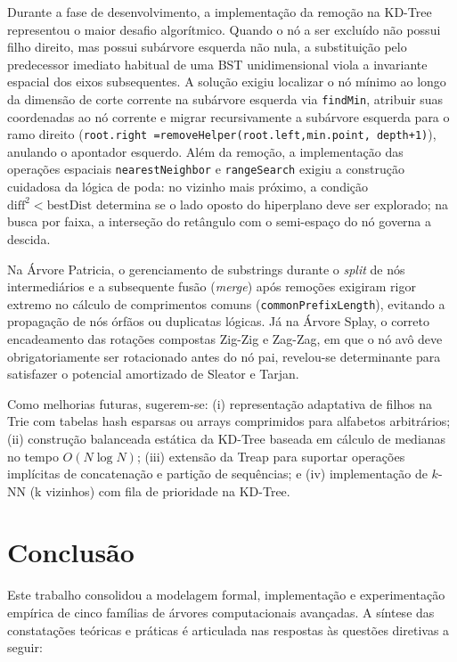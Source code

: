 \documentclass[11pt, a4paper]{article}
\begin{document}
Durante a fase de desenvolvimento, a implementação da remoção na KD-Tree representou o maior desafio algorítmico. Quando o nó a ser excluído não possui filho direito, mas possui subárvore esquerda não nula, a substituição pelo predecessor imediato habitual de uma BST unidimensional viola a invariante espacial dos eixos subsequentes. A solução exigiu localizar o nó mínimo ao longo da dimensão de corte corrente na subárvore esquerda via \texttt{findMin}, atribuir suas coordenadas ao nó corrente e migrar recursivamente a subárvore esquerda para o ramo direito (\texttt{root.right =}\allowbreak \texttt{removeHelper(root.left,}\allowbreak \texttt{min.point, depth+1)}), anulando o apontador esquerdo. Além da remoção, a implementação das operações espaciais \texttt{nearestNeighbor} e \texttt{rangeSearch} exigiu a construção cuidadosa da lógica de poda: no vizinho mais próximo, a condição $\mathrm{diff}^2 < \mathrm{bestDist}$ determina se o lado oposto do hiperplano deve ser explorado; na busca por faixa, a interseção do retângulo com o semi-espaço do nó governa a descida.

Na Árvore Patricia, o gerenciamento de substrings durante o \textit{split} de nós intermediários e a subsequente fusão (\textit{merge}) após remoções exigiram rigor extremo no cálculo de comprimentos comuns (\texttt{common\-Prefix\-Length}), evitando a propagação de nós órfãos ou duplicatas lógicas. Já na Árvore Splay, o correto encadeamento das rotações compostas Zig-Zig e Zag-Zag, em que o nó avô deve obrigatoriamente ser rotacionado antes do nó pai, revelou-se determinante para satisfazer o potencial amortizado de Sleator e Tarjan.

Como melhorias futuras, sugerem-se: (i) representação adaptativa de filhos na Trie com tabelas hash esparsas ou arrays comprimidos para alfabetos arbitrários; (ii) construção balanceada estática da KD-Tree baseada em cálculo de medianas no tempo $O(N \log N)$; (iii) extensão da Treap para suportar operações implícitas de concatenação e partição de sequências; e (iv) implementação de $k$-NN (k vizinhos) com fila de prioridade na KD-Tree.

\section{Conclusão}
\label{sec:conclusao}

Este trabalho consolidou a modelagem formal, implementação e experimentação empírica de cinco famílias de árvores computacionais avançadas. A síntese das constatações teóricas e práticas é articulada nas respostas às questões diretivas a seguir:
\end{document}
